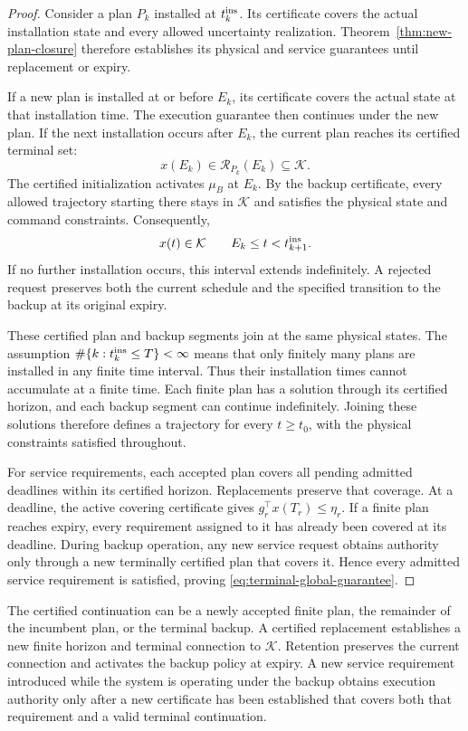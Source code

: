 \documentclass[preprint,12pt]{elsarticle}
\begin{document}
\begin{proof}
Consider a plan $P_k$ installed at $t_k^{\rm ins}$. Its certificate
covers the actual installation state and every allowed uncertainty
realization. Theorem~\ref{thm:new-plan-closure} therefore establishes its
physical and service guarantees until replacement or expiry.

If a new plan is installed at or before $E_k$, its certificate covers the
actual state at that installation time. The execution guarantee then
continues under the new plan. If the next installation occurs after
$E_k$, the current plan reaches its certified terminal set:
\[
 x(E_k)\in\mathcal R_{P_k}(E_k)\subseteq\mathcal K.
\]
The certified initialization activates $\mu_B$ at $E_k$. By the backup
certificate, every allowed trajectory starting there stays in
$\mathcal K$ and satisfies the physical state and command constraints.
Consequently,
\[
 x(t)\in\mathcal K
 \qquad E_k\le t<t_{k+1}^{\rm ins}.
\]
If no further installation occurs, this interval extends indefinitely.
A rejected request preserves both the current schedule and the specified
transition to the backup at its original expiry.

These certified plan and backup segments join at the same physical
states. The assumption
$\#\{k:t_k^{\rm ins}\le T\}<\infty$ means that only finitely many plans
are installed in any finite time interval. Thus their installation times
cannot accumulate at a finite time. Each finite plan has a solution
through its certified horizon, and each backup segment can continue
indefinitely. Joining these solutions therefore defines a trajectory for
every $t\ge t_0$, with the physical constraints satisfied throughout.

For service requirements, each accepted plan covers all pending admitted
deadlines within its certified horizon. Replacements preserve that
coverage. At a deadline, the active covering certificate gives
$g_r^\top x(T_r)\le\eta_r$. If a finite plan reaches expiry, every
requirement assigned to it has already been covered at its deadline.
During backup operation, any new service request obtains authority only
through a new terminally certified plan that covers it. Hence every
admitted service requirement is satisfied, proving
\eqref{eq:terminal-global-guarantee}.
\end{proof}

The certified continuation can be a newly accepted finite plan, the remainder
of the incumbent plan, or the terminal backup. A certified replacement
establishes a new finite horizon and terminal connection to $\mathcal K$.
Retention preserves the current connection and activates the backup policy at
expiry. A new service
requirement introduced while the system is operating under the backup obtains
execution authority only after a new certificate has been established that
covers both that requirement and a valid terminal continuation.
\end{document}
